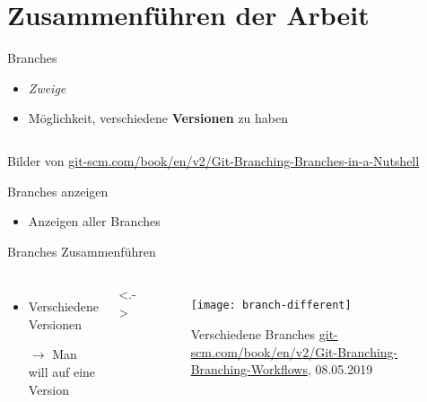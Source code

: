 \documentclass{beamer}
\begin{document}
  \section[Merge]{Zusammenführen der Arbeit}


    \begin{frame}{Branches}
      \begin{itemize}
        \item<+-> \textit{Zweige}
        \item<+-> Möglichkeit, verschiedene \textbf{Versionen} zu haben
      \end{itemize}
      \begin{columns}
       \end{columns}
      \tiny{Bilder von \url{git-scm.com/book/en/v2/Git-Branching-Branches-in-a-Nutshell}}
    \end{frame}

    \begin{frame}{Branches anzeigen}
      \begin{itemize}
        \item<+-> Anzeigen aller Branches
      \end{itemize}
    \end{frame}

    \begin{frame}{Branches Zusammenführen}
      \begin{columns}
          \begin{itemize}[<+->]
            \item Verschiedene Versionen
            \item[$\rightarrow$] Man will auf eine Version
          \end{itemize}

          \onslide<.->{
            \begin{figure}
              \texttt{[image: branch-different]}
              \caption{Verschiedene Branches \tiny{\url{git-scm.com/book/en/v2/Git-Branching-Branching-Workflows}, 08.05.2019}}
            \end{figure}
          }
      \end{columns}
    \end{frame}
\end{document}
